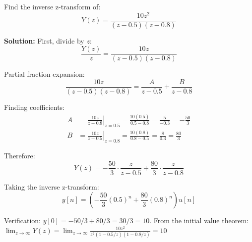 \begin{example}
Find the inverse z-transform of:
\begin{equation}
Y(z) = \frac{10z^2}{(z-0.5)(z-0.8)}
\end{equation}

\textbf{Solution:} First, divide by $z$:
\begin{equation}
\frac{Y(z)}{z} = \frac{10z}{(z-0.5)(z-0.8)}
\end{equation}

Partial fraction expansion:
\begin{equation}
\frac{10z}{(z-0.5)(z-0.8)} = \frac{A}{z-0.5} + \frac{B}{z-0.8}
\end{equation}

Finding coefficients:
\begin{align}
A &= \left.\frac{10z}{z-0.8}\right|_{z=0.5} = \frac{10(0.5)}{0.5-0.8} = \frac{5}{-0.3} = -\frac{50}{3} \\
B &= \left.\frac{10z}{z-0.5}\right|_{z=0.8} = \frac{10(0.8)}{0.8-0.5} = \frac{8}{0.3} = \frac{80}{3}
\end{align}

Therefore:
\begin{equation}
Y(z) = -\frac{50}{3} \cdot \frac{z}{z-0.5} + \frac{80}{3} \cdot \frac{z}{z-0.8}
\end{equation}

Taking the inverse z-transform:
\begin{equation}
y[n] = \left(-\frac{50}{3}(0.5)^n + \frac{80}{3}(0.8)^n\right) u[n]
\end{equation}

Verification: $y[0] = -50/3 + 80/3 = 30/3 = 10$. From the initial value theorem: $\lim_{z\to\infty} Y(z) = \lim_{z\to\infty} \frac{10z^2}{z^2(1-0.5/z)(1-0.8/z)} = 10$ \checkmark
\end{example}

